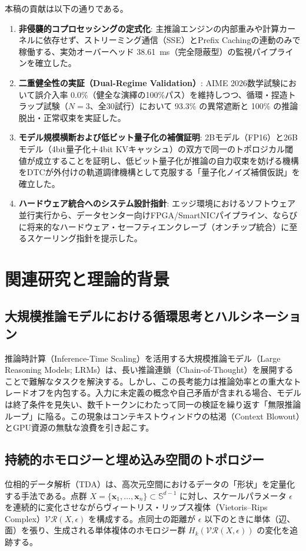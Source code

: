 \documentclass[11pt,a4paper]{article}
\begin{document}
本稿の貢献は以下の通りである。
\begin{enumerate}
    \item \textbf{非侵襲的コプロセッシングの定式化}: 主推論エンジンの内部重みや計算カーネルに依存せず、ストリーミング通信（SSE）とPrefix Cachingの連動のみで稼働する、実効オーバーヘッド 38.61~ms（完全隠蔽型）の監視パイプラインを確立した。
    \item \textbf{二重健全性の実証（Dual-Regime Validation）}: AIME 2026数学試験において誤介入率 0.0\%（健全な演繹の100\%パス）を維持しつつ、循環・捏造トラップ試験（$N=3$、全30試行）において 93.3\% の異常遮断と 100\% の推論脱出・正常収束を実証した。
    \item \textbf{モデル規模横断および低ビット量子化の補償証明}: 2Bモデル（FP16）と26Bモデル（4bit量子化＋4bit KVキャッシュ）の双方で同一のトポロジカル閾値が成立することを証明し、低ビット量子化が推論の自力収束を妨げる機構をDTCが外付けの軌道調律機構として克服する「量子化ノイズ補償仮説」を確立した。
    \item \textbf{ハードウェア統合へのシステム設計指針}: エッジ環境におけるソフトウェア並行実行から、データセンター向けFPGA/SmartNICパイプライン、ならびに将来的なハードウェア・セーフティエンクレーブ（オンチップ統合）に至るスケーリング指針を提示した。
\end{enumerate}

\section{関連研究と理論的背景}

\subsection{大規模推論モデルにおける循環思考とハルシネーション}
推論時計算（Inference-Time Scaling）を活用する大規模推論モデル（Large Reasoning Models; LRMs）は、長い推論連鎖（Chain-of-Thought）を展開することで難解なタスクを解決する。しかし、この長考能力は推論効率との重大なトレードオフを内包する。入力に未定義の概念や自己矛盾が含まれる場合、モデルは終了条件を見失い、数千トークンにわたって同一の検証を繰り返す「無限推論ループ」に陥る。この現象はコンテキストウィンドウの枯渇（Context Blowout）とGPU資源の無駄な浪費を引き起こす。

\subsection{持続的ホモロジーと埋め込み空間のトポロジー}
位相的データ解析（TDA）は、高次元空間におけるデータの「形状」を定量化する手法である。点群 $X = \{\mathbf{x}_1, \dots, \mathbf{x}_n\} \subset \mathbb{S}^{d-1}$ に対し、スケールパラメータ $\epsilon$ を連続的に変化させながらヴィートリス・リップス複体（Vietoris--Rips Complex）$\mathcal{VR}(X, \epsilon)$ を構成する。点同士の距離が $\epsilon$ 以下のときに単体（辺、面）を張り、生成される単体複体のホモロジー群 $H_k(\mathcal{VR}(X, \epsilon))$ の変化を追跡する。
\end{document}
